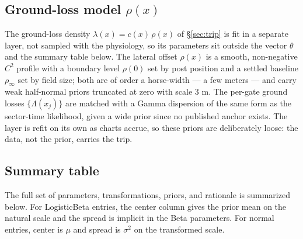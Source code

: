\documentclass[11pt]{article}
\begin{document}
\subsection*{Ground-loss model $\rho(x)$}
The ground-loss density $\lambda(x) = c(x)\,\rho(x)$ of \S\ref{sec:trip} is fit in a separate layer, not sampled with the physiology, so its parameters sit outside the vector $\theta$ and the summary table below. The lateral offset $\rho(x)$ is a smooth, non-negative $C^2$ profile with a boundary level $\rho(0)$ set by post position and a settled baseline $\rho_\infty$ set by field size; both are of order a horse-width --- a few meters --- and carry weak half-normal priors truncated at zero with scale $3$ m. The per-gate ground losses $\{\Lambda(x_j)\}$ are matched with a Gamma dispersion of the same form as the sector-time likelihood, given a wide prior since no published anchor exists. The layer is refit on its own as charts accrue, so these priors are deliberately loose: the data, not the prior, carries the trip.

\subsection*{Summary table}
The full set of parameters, transformations, priors, and rationale is summarized below. For LogisticBeta entries, the center column gives the prior mean on the natural scale and the spread is implicit in the Beta parameters. For normal entries, center is $\mu$ and spread is $\sigma^2$ on the transformed scale.
\end{document}
